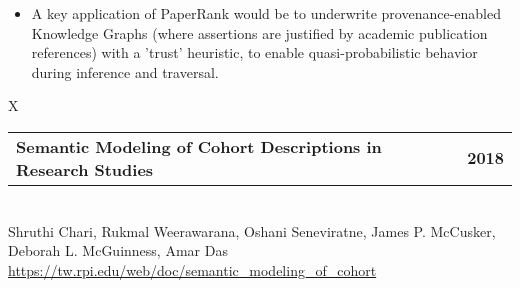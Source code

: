 \documentclass[10pt]{article}
\newcommand{\tabularxwidth}{\textwidth}
\begin{document}
\begin{minipage}{\tabularxwidth}
\begin{itemize}[noitemsep, topsep=3pt, parsep=0pt, partopsep=0pt]
                \item 
    A key application of PaperRank would be to underwrite provenance-enabled Knowledge Graphs (where assertions are justified by academic publication references) with a 'trust' heuristic, to enable quasi-probabilistic behavior during inference and traversal.
            
        \end{itemize}

        
            \vspace{.5em}
        

        \end{minipage}
    
        \begin{minipage}{\tabularxwidth}
        \begin{tabularx}{\tabularxwidth}{X}
            {
                \begin{tabularx}{\tabularxwidth}{@{}X r}
                    \textbf{Semantic Modeling of Cohort Descriptions in Research Studies} &
                    \textbf{
        2018} \\
                \end{tabularx}
            } \\
            Shruthi Chari, Rukmal Weerawarana, Oshani Seneviratne, James P. McCusker, Deborah L. McGuinness, Amar Das \\

            
            
                \url{https://tw.rpi.edu/web/doc/semantic_modeling_of_cohort} \\
            
            
        \end{tabularx}

        \begin{itemize}[noitemsep, topsep=3pt, parsep=0pt, partopsep=0pt]
            

\end{itemize}
\end{minipage}
\end{document}
